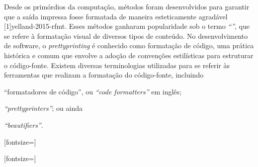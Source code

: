 \documentclass
  [11pt,a4paper,english,brazil,openright,sumario=tradicional,twoside]
  {abntex2}
\begin{document}
  Desde os primórdios da computação, métodos foram desenvolvidos para garantir
  que a saída impressa fosse formatada de maneira esteticamente agradável
  [1]{yelland-2015-rfmt}. Esses métodos ganharam
  popularidade sob o termo \textit{``''}, que se refere à
  formatação visual de diversos tipos de conteúdo. No desenvolvimento de
  software, o \textit{prettyprinting} é conhecido como formatação de código,
  uma prática histórica e comum que envolve a adoção de convenções estilísticas
  para estruturar o código-fonte. Existem diversas terminologias utilizadas
  para se referir às ferramentas que realizam a formatação do código-fonte,
  incluindo
  \begin{inparaenum}
    \item ``formatadores de código'', ou \textit{``code formatters''} em
          inglês;
    \item \textit{``prettyprinters''}; ou ainda
    \item \textit{``beautifiers''}.
  \end{inparaenum}

  \newsavebox\mexpressionexample
  \begin{lrbox}{\mexpressionexample}
    [fontsize=\footnotesize]
  \end{lrbox}

  \newsavebox\sexpressionexample
  \begin{lrbox}{\sexpressionexample}
    [fontsize=\footnotesize]
  \end{lrbox}
\end{document}
